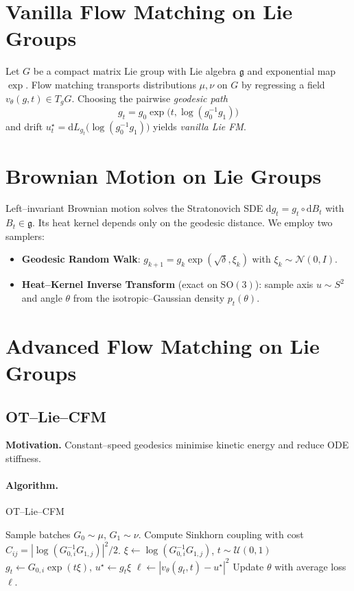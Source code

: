 \documentclass[11pt]{article}
\begin{document}
\section{Vanilla Flow Matching on Lie Groups}
Let $G$ be a compact matrix Lie group with Lie algebra $\mathfrak g$ and exponential map $\exp$.  Flow matching transports distributions $\mu,\nu$ on $G$ by regressing a field $v_\theta(g,t)\in T_gG$.  Choosing the pairwise \emph{geodesic path}
\begin{equation}
g_t = g_0\exp\bigl(t,\log(g_0^{-1}g_1)\bigr)
\end{equation}
and drift $u_t^{\star}=\mathrm dL_{g_t}\bigl(\log(g_0^{-1}g_1)\bigr)$ yields \emph{vanilla Lie FM}.

\section{Brownian Motion on Lie Groups}
Left--invariant Brownian motion solves the Stratonovich SDE $\mathrm d g_t=g_t\circ\mathrm dB_t$ with $B_t\in\mathfrak g$.  Its heat kernel depends only on the geodesic distance.  We employ two samplers:
\begin{itemize}\item \textbf{Geodesic Random Walk}: $g_{k+1}=g_k\exp(\sqrt\delta,\xi_k)$ with $\xi_k\sim\mathcal N(0,I)$.\item \textbf{Heat--Kernel Inverse Transform} (exact on $\mathrm{SO}(3)$): sample axis $u\sim S^2$ and angle $\theta$ from the isotropic--Gaussian density $p_t(\theta)$.\end{itemize}

\section{Advanced Flow Matching on Lie Groups}
\subsection{OT--Lie--CFM}
\textbf{Motivation.} Constant--speed geodesics minimise kinetic energy and reduce ODE stiffness.

\paragraph{Algorithm.}
\begin{algorithm}[H]
\caption{OT--Lie--CFM}
\begin{algorithmic}[1]
\State Sample batches $G_0\sim\mu$, $G_1\sim\nu$.
\State Compute Sinkhorn coupling with cost $C_{ij}=|\log(G_{0,i}^{-1}G_{1,j})|^2/2$.
\State $\xi\gets\log(G_{0,i}^{-1}G_{1,j})$, $t\sim\mathcal U(0,1)$
\State $g_t\gets G_{0,i}\exp(t\xi)$, $u^{\star}\gets g_t\xi$
\State $\ell\gets|v_\theta(g_t,t)-u^{\star}|^2$
\EndFor
\State Update $\theta$ with average loss $\ell$.
\end{algorithmic}
\end{algorithm}
\end{document}
